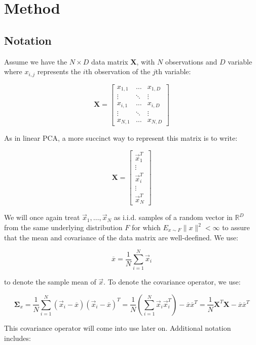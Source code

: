 \documentclass[]{article}
\begin{document}
\section{Method}

\subsection{Notation}

Assume we have the \(N \times D\) data matrix \(\mathbf{X}\), with \(N\)
observations and \(D\) variable where \(x_{i,j}\) represents the \(i\)th
observation of the \(j\)th variable:

\[
\mathbf{X} = \begin{bmatrix}
x_{1,1} & \dots & x_{1,D} \\
\vdots & \ddots & \vdots \\
x_{i,1} & \dots & x_{i,D} \\
\vdots & \ddots & \vdots \\
x_{N,1} & \dots & x_{N,D}
\end{bmatrix}
\]

As in linear PCA, a more succinct way to represent this matrix is to
write:

\[
\mathbf{X} = \begin{bmatrix} \vec{x}_1^T \\ \vdots \\ \vec{x}_i
^T\\ \vdots \\ \vec{x}_N^T \end{bmatrix}
\]

We will once again treat \(\vec{x}_1, \dots, \vec{x}_N\) as i.i.d.
samples of a random vector in \(\mathbb{R}^D\) from the same underlying
distribution \(F\) for which \(E_{x \sim F} \|x\|^2 < \infty\) to assure
that the mean and covariance of the data matrix are well-deefined. We
use:

\[
\overline{x} = \frac{1}{N} \sum_{i = 1}^N \vec{x}_i
\]

to denote the sample mean of \(\vec{x}\). To denote the covariance
operator, we use:

\[
\mathbf{\Sigma}_x = \frac{1}{N} \sum_{i = 1}^N (\vec{x}_i - \overline{x})(\vec{x}_i - \overline{x})^T = \frac{1}{N} \left(\sum_{i = 1}^N \vec{x}_i \vec{x}_i^T \right) - \overline{x}\overline{x}^T = \frac{1}{N} \mathbf{X}^T \mathbf{X} - \overline{x} \overline{x}^T
\]

This covariance operator will come into use later on. Additional
notation includes:
\end{document}
